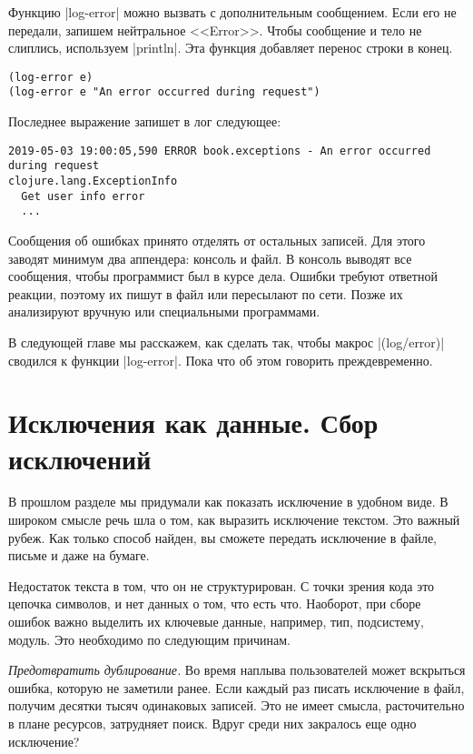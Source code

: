 Функцию \spverb|log-error| можно вызвать с дополнительным сообщением. Если его
не передали, запишем нейтральное <<Error>>. Чтобы сообщение и тело не слиплись,
используем \spverb|println|. Эта функция добавляет перенос строки в конец.

\begin{verbatim}
(log-error e)
(log-error e "An error occurred during request")
\end{verbatim}

Последнее выражение запишет в лог следующее:

\begin{verbatim}
2019-05-03 19:00:05,590 ERROR book.exceptions - An error occurred during request
clojure.lang.ExceptionInfo
  Get user info error
  ...
\end{verbatim}

Сообщения об ошибках принято отделять от остальных записей. Для этого заводят
минимум два аппендера: консоль и файл. В консоль выводят все сообщения, чтобы
программист был в курсе дела. Ошибки требуют ответной реакции, поэтому их пишут
в файл или пересылают по сети. Позже их анализируют вручную или специальными
программами.

В следующей главе мы расскажем, как сделать так, чтобы макрос
\spverb|(log/error)| сводился к функции \spverb|log-error|. Пока что об этом
говорить преждевременно.

\section{Исключения как данные. Сбор исключений}

В прошлом разделе мы придумали как показать исключение в удобном виде. В широком
смысле речь шла о том, как выразить исключение текстом. Это важный рубеж. Как
только способ найден, вы сможете передать исключение в файле, письме и даже на
бумаге.

Недостаток текста в том, что он не структурирован. С точки зрения кода это
цепочка символов, и нет данных о том, что есть что. Наоборот, при сборе ошибок
важно выделить их ключевые данные, например, тип, подсистему, модуль. Это
необходимо по следующим причинам.

\emph{Предотвратить дублирование.} Во время наплыва пользователей может вскрыться
ошибка, которую не заметили ранее. Если каждый раз писать исключение в файл,
получим десятки тысяч одинаковых записей. Это не имеет смысла, расточительно в
плане ресурсов, затрудняет поиск. Вдруг среди них закралось еще одно исключение?

